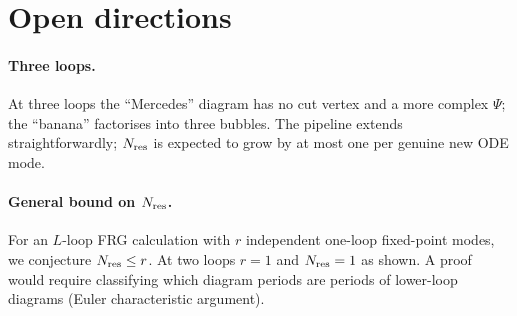 \documentclass[10pt,a4paper,twocolumn]{article}
\theoremstyle{plain}
\theoremstyle{definition}
\renewcommand{\Psi}{\varPsi}
\newcommand{\Nres}{N_{\rm res}}
\begin{document}
\section{Open directions}
\label{sec:open}

\paragraph{Three loops.}
At three loops the ``Mercedes'' diagram has no cut vertex and a more
complex $\Psi$; the ``banana'' factorises into three bubbles.
The pipeline extends straightforwardly; $\Nres$ is expected to
grow by at most one per genuine new ODE mode.

\paragraph{General bound on $\Nres$.}
For an $L$-loop FRG calculation with $r$ independent one-loop
fixed-point modes, we conjecture $\Nres \leq r$.  At two loops
$r=1$ and $\Nres = 1$ as shown.  A proof would require
classifying which diagram periods are periods of lower-loop
diagrams (Euler characteristic argument).
\end{document}
